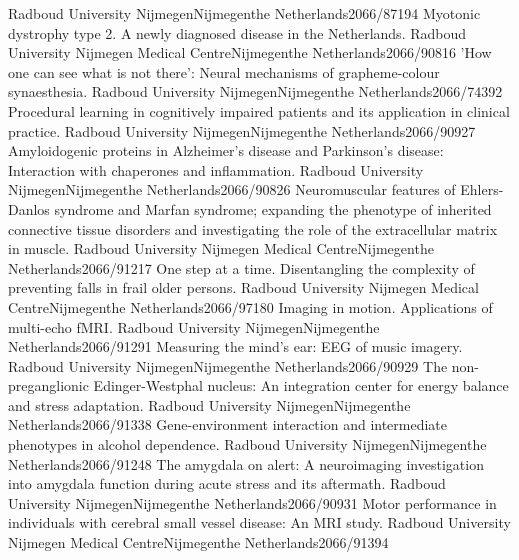 	{Radboud University Nijmegen}{Nijmegen}{the Netherlands}{2066/87194}
	{Myotonic dystrophy type 2. A newly diagnosed disease in the Netherlands.}
	{Radboud University Nijmegen Medical Centre}{Nijmegen}{the Netherlands}{2066/90816}
	{'How one can see what is not there': Neural mechanisms of grapheme-colour synaesthesia.}
	{Radboud University Nijmegen}{Nijmegen}{the Netherlands}{2066/74392}
	{Procedural learning in cognitively impaired patients and its application in clinical practice.}
	{Radboud University Nijmegen}{Nijmegen}{the Netherlands}{2066/90927}
	{Amyloidogenic proteins in Alzheimer's disease and Parkinson's disease: Interaction with chaperones and inflammation.}
	{Radboud University Nijmegen}{Nijmegen}{the Netherlands}{2066/90826}
	{Neuromuscular features of Ehlers-Danlos syndrome and Marfan syndrome; expanding the phenotype of inherited connective tissue disorders and investigating the role of the extracellular matrix in muscle.}
	{Radboud University Nijmegen Medical Centre}{Nijmegen}{the Netherlands}{2066/91217}
	{One step at a time. Disentangling the complexity of preventing falls in frail older persons.}
	{Radboud University Nijmegen Medical Centre}{Nijmegen}{the Netherlands}{2066/97180}
	{Imaging in motion. Applications of multi-echo fMRI.}
	{Radboud University Nijmegen}{Nijmegen}{the Netherlands}{2066/91291}
	{Measuring the mind's ear: EEG of music imagery.}
	{Radboud University Nijmegen}{Nijmegen}{the Netherlands}{2066/90929}
	{The non-preganglionic Edinger-Westphal nucleus: An integration center for energy balance and stress adaptation.}
	{Radboud University Nijmegen}{Nijmegen}{the Netherlands}{2066/91338}
	{Gene-environment interaction and intermediate phenotypes in alcohol dependence.}
	{Radboud University Nijmegen}{Nijmegen}{the Netherlands}{2066/91248}
	{The amygdala on alert: A neuroimaging investigation into amygdala function during acute stress and its aftermath.}
	{Radboud University Nijmegen}{Nijmegen}{the Netherlands}{2066/90931}
	{Motor performance in individuals with cerebral small vessel disease: An MRI study.}
	{Radboud University Nijmegen Medical Centre}{Nijmegen}{the Netherlands}{2066/91394}
